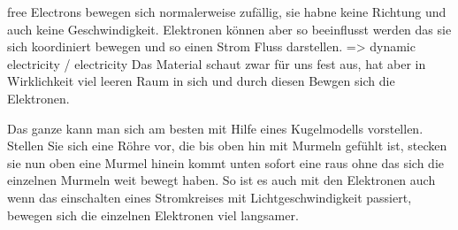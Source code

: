 \documentclass[../Elektrizitaet.tex]{subfiles}
\begin{document}
free Electrons bewegen sich normalerweise zufällig, sie habne keine Richtung und auch keine Geschwindigkeit.  
Elektronen können aber so beeinflusst werden das sie sich koordiniert bewegen und so einen Strom Fluss darstellen.  
=> dynamic electricity / electricity  
Das Material schaut zwar für uns fest aus, hat aber in Wirklichkeit viel leeren Raum in sich und durch diesen Bewgen sich die Elektronen.

Das ganze kann man sich am besten mit Hilfe eines Kugelmodells vorstellen.
Stellen Sie sich eine Röhre vor, die bis oben hin mit Murmeln gefühlt ist, stecken sie nun oben eine Murmel hinein kommt unten sofort eine raus ohne das sich die einzelnen Murmeln weit bewegt haben.  
So ist es auch mit den Elektronen auch wenn das einschalten eines Stromkreises mit Lichtgeschwindigkeit passiert, bewegen sich die einzelnen Elektronen viel langsamer.
\end{document}
